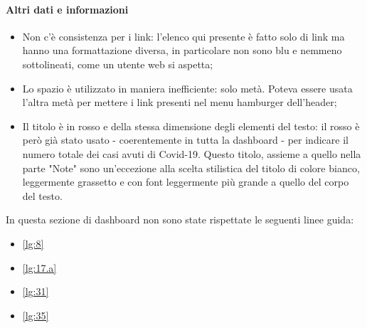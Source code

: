 \paragraph{Altri dati e informazioni}
\begin{itemize}
    \item Non c'è consistenza per i link: l'elenco qui presente è fatto solo di link ma hanno una formattazione diversa, in particolare non sono blu e nemmeno sottolineati, come un utente web si aspetta;
    \item Lo spazio è utilizzato in maniera inefficiente: solo metà. Poteva essere usata l'altra metà per mettere i link presenti nel menu hamburger dell'header;
    \item Il titolo è in rosso e della stessa dimensione degli elementi del testo: il rosso è però già stato usato - coerentemente in tutta la dashboard - per indicare il numero totale dei casi avuti di Covid-19. Questo titolo, assieme a quello nella parte "Note" sono un'eccezione alla scelta stilistica del titolo di colore bianco, leggermente grassetto e con font leggermente più grande a quello del corpo del testo.
\end{itemize}
In questa sezione di dashboard non sono state rispettate le seguenti linee guida:
\begin{itemize}
    \item \ref{lg:8}
    \item \ref{lg:17.a}
    \item \ref{lg:31}
    \item \ref{lg:35}
\end{itemize}

